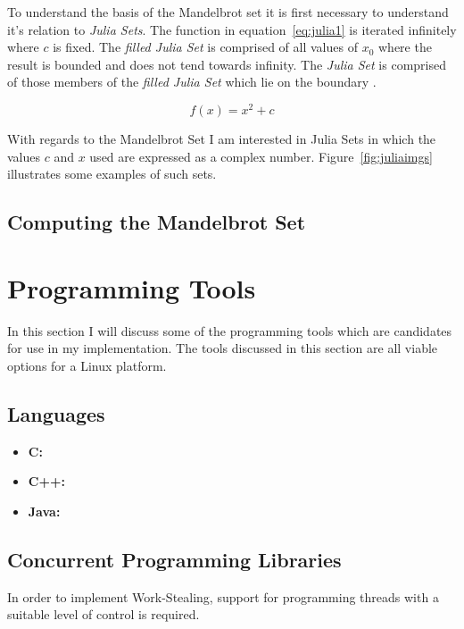 To understand the basis of the Mandelbrot set it is first necessary to understand it's relation to \textit{Julia Sets}.
The function in equation~\ref{eq:julia1} is iterated infinitely where \(c\) is fixed.
The \textit{filled Julia Set} is comprised of all values of \(x_0\) where the result is bounded and does not tend towards infinity.
The \textit{Julia Set} is comprised of those members of the \textit{filled Julia Set} which lie on the boundary \cite{chaosfract}.

\begin{equation}\label{eq:julia1}
f(x) = x^2 + c
\end{equation}


With regards to the Mandelbrot Set I am interested in Julia Sets in which the values \(c\) and \(x\) used are expressed as a complex number. 
Figure~\ref{fig:juliaimgs} illustrates some examples of such sets. 


\subsection*{Computing the Mandelbrot Set}


\section{Programming Tools}

In this section I will discuss some of the programming tools which are candidates
for use in my implementation. 
The tools discussed in this section are all viable options for a Linux platform.

\subsection*{Languages}

\begin{itemize}
\item \textbf{C:} 
\item \textbf{C++:}
\item \textbf{Java:}
\end{itemize}

\subsection*{Concurrent Programming Libraries}
In order to implement Work-Stealing, support for programming threads 
with a suitable level of control is required.

